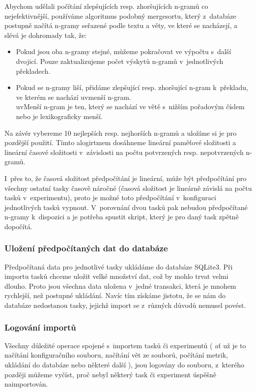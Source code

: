 Abychom udělali počítání zlepšujících resp. zhoršujících \mbox{n-gramů} co nejefektivnější,
  používáme algoritmus podobný mergesortu,
  který z~databáze postupně načítá \mbox{n-gramy} seřazené podle textu a věty, ve které se nacházejí, 
  a slévá je dohromady tak, že:

\begin{itemize}
  \item Pokud jsou oba \mbox{n-gramy} stejné, můžeme pokračovat ve výpočtu s~další dvojicí.
    Pouze zaktualizujeme počet výskytů \mbox{n-gramů} v~jednotlivých překladech. 
  \item Pokud se \mbox{n-gramy} liší, přidáme zlepšující resp. zhoršující \mbox{n-gram} k~překladu,
    ve kterém se nachází uv{menší \mbox{n-gram}}. \\
    uv{Menší \mbox{n-gram}} je ten, který se nachází ve větě s~nižším pořadovým číslem
    nebo je lexikograficky menší.
\end{itemize}

Na závěr vybereme 10 nejlepších resp. nejhorších \mbox{n-gramů}
  a uložíme si je pro pozdější použití.
Tímto alogirtmem dosáhneme lineární paměťové složitosti a
  lineární časové složitosti v~závislosti na počtu potvrzených resp. nepotvrzených \mbox{n-gramů}.

I~přes to, že časová složitost předpočítání je lineární,
  může být předpočítání pro všechny ostatní tasky časově náročné
  (časová složitost je lineárně závislá na počtu tasků v~experimentu),
  proto je možné toto předpočítání v~konfiguraci jednotlivých tasků vypnout.
V~porovnání dvou tasků pak nebudou předpočítané \mbox{n-gramy} k~dispozici
  a je potřeba spustit skript,
  který je pro daný task zpětně dopočítá.

\subsubsection{Uložení předpočítaných dat do databáze}
Předpočítaná data pro jednotlivé tasky ukládáme do databáze SQLite3.
Při importu tasků chceme uložit velké množství dat,
  což by mohlo trvat velmi dlouho.
Proto jsou všechna data uložena v~jedné transakci,
  která je mnohem rychlejší,
  než postupné ukládání.
Navíc tím získáme jistotu,
  že se nám do databáze nedostanou tasky,
  jejichž import se z~různých důvodů nemusel povést.
 
\subsubsection{Logování importů}
Všechny důležité operace spojené s~importem tasků či experimentů
  ( ať už je to načítání konfiguračního souboru, načítání vět ze souborů,
  počítání metrik, ukládání do databáze nebo některé další ), 
  jsou logovány do souboru,
  z~kterého později můžeme vyčíst,
  proč nebyl některý task či experiment úspěšně naimportován. 


